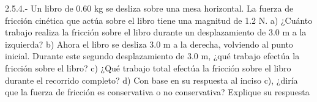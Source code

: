 \documentclass[
]{article}
\begin{document}
2.5.4.- Un libro de 0.60 kg se desliza sobre una mesa horizontal. La
fuerza de fricción cinética que actúa sobre el libro tiene una magnitud
de 1.2 N. a) ¿Cuánto trabajo realiza la fricción sobre el libro durante
un desplazamiento de 3.0 m a la izquierda? b) Ahora el libro se desliza
3.0 m a la derecha, volviendo al punto inicial. Durante este segundo
desplazamiento de 3.0 m, ¿qué trabajo efectúa la fricción sobre el
libro? c) ¿Qué trabajo total efectúa la fricción sobre el libro durante
el recorrido completo? d) Con base en su respuesta al inciso c), ¿diría
que la fuerza de fricción es conservativa o no conservativa? Explique su
respuesta
\end{document}
